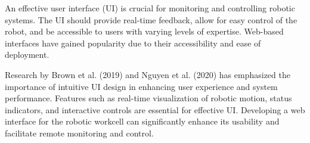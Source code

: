 An effective user interface (UI) is crucial for monitoring and controlling robotic systems. The UI should provide real-time feedback, allow for easy control of the robot, and be accessible to users with varying levels of expertise. Web-based interfaces have gained popularity due to their accessibility and ease of deployment.

Research by Brown et al. (2019) and Nguyen et al. (2020) has emphasized the importance of intuitive UI design in enhancing user experience and system performance. Features such as real-time visualization of robotic motion, status indicators, and interactive controls are essential for effective UI. Developing a web interface for the robotic workcell can significantly enhance its usability and facilitate remote monitoring and control.